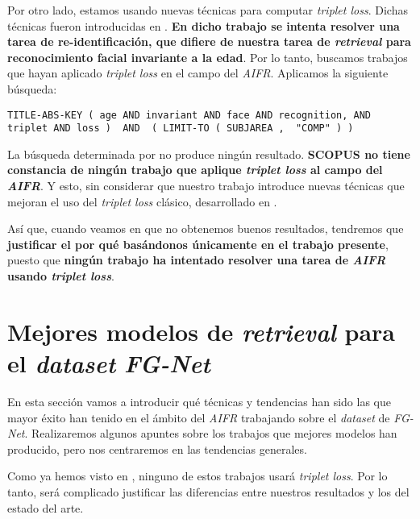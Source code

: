 Por otro lado, estamos usando nuevas técnicas para computar \textit{triplet loss}. Dichas técnicas fueron introducidas en \cite{informatica:principal}. \textbf{En dicho trabajo se intenta resolver una tarea de re-identificación, que difiere de nuestra tarea de \textit{retrieval} para reconocimiento facial invariante a la edad}. Por lo tanto, buscamos trabajos que hayan aplicado \textit{triplet loss} en el campo del \textit{AIFR}. Aplicamos la siguiente búsqueda:

\begin{lstlisting}[caption=Keywords usandos para la búsqueda de trabajos que combinen \textit{AIFR} y \textit{triplet loss} en \textit{SCOPUS}, label=code:scopus_search_especifico, captionpos=b]
    TITLE-ABS-KEY ( age AND invariant AND face AND recognition, AND triplet AND loss )  AND  ( LIMIT-TO ( SUBJAREA ,  "COMP" ) )
\end{lstlisting}

La búsqueda determinada por  no produce ningún resultado. \textbf{SCOPUS no tiene constancia de ningún trabajo que aplique \textit{triplet loss} al campo del \textit{AIFR}}. Y esto, sin considerar que nuestro trabajo introduce nuevas técnicas que mejoran el uso del \textit{triplet loss} clásico, desarrollado en .

Así que, cuando veamos en  que no obtenemos buenos resultados, tendremos que \textbf{justificar el por qué basándonos únicamente en el trabajo presente}, puesto que \textbf{ningún trabajo ha intentado resolver una tarea de \textit{AIFR} usando \textit{triplet loss}}.

\section{Mejores modelos de \textit{retrieval} para el \textit{dataset} \textit{FG-Net}}

En esta sección vamos a introducir qué técnicas y tendencias han sido las que mayor éxito han tenido en el ámbito del \textit{AIFR} trabajando sobre el \textit{dataset} de \textit{FG-Net}. Realizaremos algunos apuntes sobre los trabajos que mejores modelos han producido, pero nos centraremos en las tendencias generales.

Como ya hemos visto en , ninguno de estos trabajos usará \textit{triplet loss}. Por lo tanto, será complicado justificar las diferencias entre nuestros resultados y los del estado del arte.

